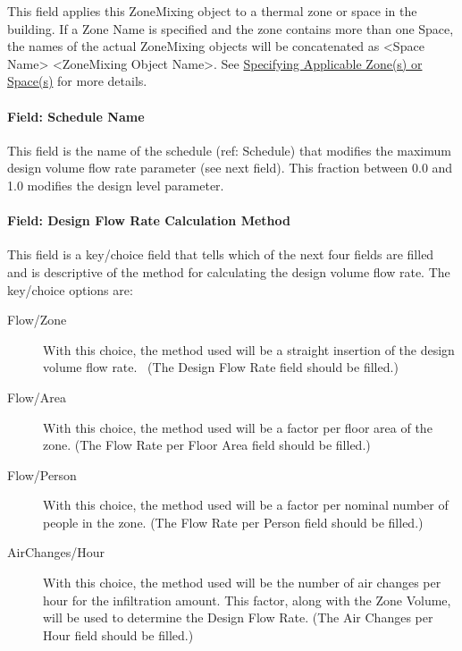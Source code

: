 This field applies this ZoneMixing object to a thermal zone or space in the building. If a Zone Name is specified and the zone contains more than one Space, the names of the actual ZoneMixing objects will be concatenated as \textless{}Space Name\textgreater{} \textless{}ZoneMixing Object Name\textgreater{}. See \hyperref[specifying-applicable-zones-or-spaces]{Specifying Applicable Zone(s) or Space(s)} for more details.

\paragraph{Field: Schedule Name}\label{field-schedule-name-3}

This field is the name of the schedule (ref: Schedule) that modifies the maximum design volume flow rate parameter (see next field). This fraction between 0.0 and 1.0 modifies the design level parameter.

\paragraph{Field: Design Flow Rate Calculation Method}\label{field-design-flow-rate-calculation-method-2}

This field is a key/choice field that tells which of the next four fields are filled and is descriptive of the method for calculating the design volume flow rate. The key/choice options are:

\begin{description}

\item[Flow/Zone] With this choice, the method used will be a straight insertion of the design volume flow rate.~ (The Design Flow Rate field should be filled.)

\item[Flow/Area] With this choice, the method used will be a factor per floor area of the zone. (The Flow Rate per Floor Area field should be filled.)

\item[Flow/Person] With this choice, the method used will be a factor per nominal number of people in the zone. (The Flow Rate per Person field should be filled.)

\item[AirChanges/Hour] With this choice, the method used will be the number of air changes per hour for the infiltration amount. This factor, along with the Zone Volume, will be used to determine the Design Flow Rate. (The Air Changes per Hour field should be filled.)

\end{description}


